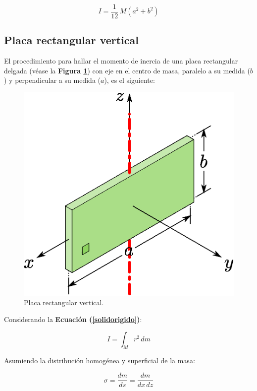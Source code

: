 \documentclass[letter,oneside,11pt]{article}
\begin{document}
\begin{equation}
    I = \frac{1}{12}\, M (a^2 + b^2)
\end{equation}

\subsection{Placa rectangular vertical}
El procedimiento para hallar el momento de inercia de una placa rectangular
delgada (véase la \textbf{Figura \ref{figura10}}) con eje en el centro de masa,
paralelo a su medida ($b$) y perpendicular a su medida ($a$), es el siguiente:

\begin{figure}
\centering
\includegraphics[scale=0.5]{resources/f10.eps}
\caption{Placa rectangular vertical.}
\label{figura10}
\end{figure}

Considerando la \textbf{Ecuación (\ref{solidorigido})}:

\begin{equation*}
    I = \int_{M} r^2\, dm
\tag{4}
\end{equation*}

Asumiendo la distribución homogénea y superficial de la masa:

\begin{equation*}
    \sigma = \frac{dm}{ds} = \frac{dm}{dx\, dz}
\end{equation*}
\end{document}
